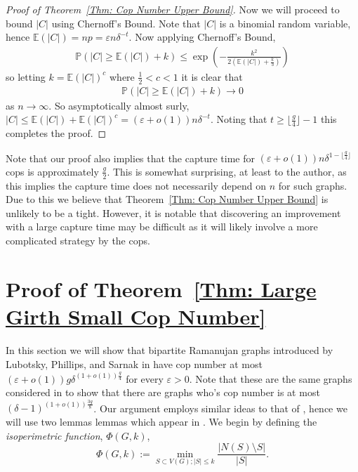 \documentclass{amsart}
\DeclareMathOperator{\exponential}{exp}
\theoremstyle{definition}
\def\epsilon{\varepsilon}
\begin{document}
\begin{proof}[Proof of Theorem~\ref{Thm: Cop Number Upper Bound}]
Now we will proceed to bound $|C|$ using Chernoff's Bound. Note that $|C|$ is a binomial random variable, hence $\mathbb{E}(|C|) = np = \epsilon n \delta^{ - t}$. Now applying Chernoff's Bound,
\begin{align*} 
\mathbb{P}(|C| \geq \mathbb{E}(|C|)+k) \leq \exponential(- \frac{k^2}{2(\mathbb{E}(|C|)+ \frac{k}{3})})
\end{align*}
so letting $k = \mathbb{E}(|C|)^{c}$ where $\frac{1}{2}<c<1$ it is clear that 
\begin{align*} 
\mathbb{P}(|C| \geq \mathbb{E}(|C|)+k) \rightarrow 0
\end{align*}
as $n \rightarrow \infty$. So asymptotically almost surly, $|C| \leq  \mathbb{E}(|C|) + \mathbb{E}(|C|)^{c} = (\epsilon+o(1))n \delta^{-t}$. Noting that $t \geq \lfloor \frac{g}{4} \rfloor -1$ this completes the proof.
\end{proof}



Note that our proof also implies that the capture time for $(\epsilon + o(1))n \delta^{1 - \lfloor \frac{g}{4} \rfloor}$ cops is approximately $\frac{g}{2}$. This is somewhat surprising, at least to the author, as this implies the capture time does not necessarily depend on $n$ for such graphs. Due to this we believe that Theorem~\ref{Thm: Cop Number Upper Bound} is unlikely to be a tight. However, it is notable that discovering an improvement with a large capture time may be difficult as it will likely involve a more complicated strategy by the cops.




\vspace{0.5cm}
\section{Proof of Theorem~\ref{Thm: Large Girth Small Cop Number}}


In this section we will show that bipartite Ramanujan graphs introduced by Lubotsky, Phillips, and Sarnak in \cite{lubotzky1988ramanujan} have cop number at most $(\epsilon + o(1))g\delta^{(1+o(1))\frac{g}{4}}$ for every $\epsilon>0$. Note that these are the same graphs considered in \cite{bradshaw2023cop} to show that there are graphs who's cop number is at most $(\delta-1)^{(1+o(1))\frac{3g}{8}}$.  Our argument employs similar ideas to that of \cite{bradshaw2023cop}, hence we will use two lemmas lemmas which appear in \cite{bradshaw2023cop}. We begin by defining the \emph{isoperimetric function}, $\Phi (G,k)$, 
\[
\Phi (G,k) := \min_{S\subset V(G); |S| \leq k} \frac{|N(S)\setminus S|}{|S|} .
\]
\end{document}
